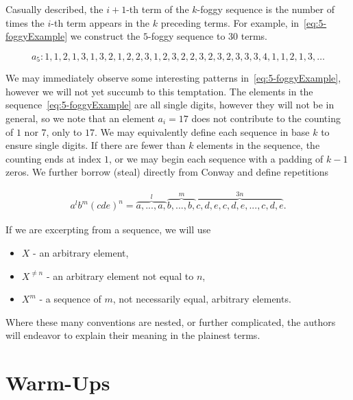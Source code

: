 \documentclass{article}
\begin{document}
Casually described, the $i+1$-th term of the $k$-foggy sequence is the number of times the $i$-th term appears in the $k$ preceding terms. For example, in~\eqref{eq:5-foggyExample} we construct the $5$-foggy sequence to 30 terms.

\begin{equation}
	a_5 : 1,1,2,1,3,1,3,2,1,2,2,3,1,2,3,2,2,3,2,3,2,3,3,3,4,1,1,2,1,3,\dots \label{eq:5-foggyExample}
\end{equation}

We may immediately observe some interesting patterns in~\eqref{eq:5-foggyExample}, however we will not yet succumb to this temptation. The elements in the sequence~\eqref{eq:5-foggyExample} are all single digits, however they will not be in general, so we note that an element $a_i=17$ does not contribute to the counting of $1$ nor $7$, only to $17$. We may equivalently define each sequence in base $k$ to ensure single digits. If there are fewer than $k$ elements in the sequence, the counting ends at index $1$, or we may begin each sequence with a padding of $k-1$ zeros. We further borrow (steal) directly from Conway and define repetitions

\begin{align*}
a^lb^m(cde)^n = \overbrace{a,...,a,}^{l}\overbrace{b,...,b,}^{m}\overbrace{c,d,e,c,d,e,...,c,d,e}^{3n}.
\end{align*} 

If we are excerpting from a sequence, we will use
\begin{itemize}
  \item $X$ - an arbitrary element,
  \item $X^{\neq n}$ - an arbitrary element not equal to $n$,
  \item $X^m$ - a sequence of $m$, not necessarily equal, arbitrary elements.
\end{itemize}

Where these many conventions are nested, or further complicated, the authors will endeavor to explain their meaning in the plainest terms.

\section{Warm-Ups}
\label{sec:warm-ups}
\end{document}
